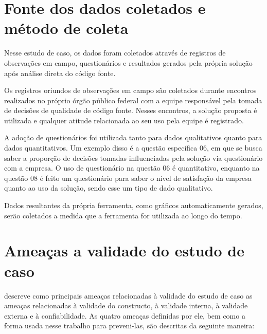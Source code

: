 \section{Fonte dos dados coletados e método de coleta}

Nesse estudo de caso, os dados foram coletados através de registros de observações em campo, questionários e resultados gerados pela própria solução após análise direta do código fonte.

Os registros oriundos de observações em campo são coletados durante encontros realizados no próprio órgão público federal com a equipe responsável pela tomada de decisões de qualidade de código fonte. Nesses encontros, a solução proposta é utilizada e qualquer atitude relacionada ao seu uso pela equipe é registrado.

A adoção de questionários foi utilizada tanto para dados qualitativos quanto para dados quantitativos. Um exemplo disso é a questão específica 06, em que se busca saber a proporção de decisões tomadas influenciadas pela solução via questionário com a empresa. O uso de questionário na questão 06 é quantitativo, enquanto na questão 08 é feito um questionário para saber o nível de satisfação da empresa quanto ao uso da solução, sendo esse um tipo de dado qualitativo.

Dados resultantes da própria ferramenta, como gráficos automaticamente gerados, serão coletados a medida que a ferramenta for utilizada ao longo do tempo.

\section{Ameaças a validade do estudo de caso}

 descreve como principais ameaças relacionadas à validade do estudo de caso as ameaças relacionadas à validade do constructo, à validade interna, à validade externa e à confiabilidade. As quatro ameaças definidas por ele, bem como a forma usada nesse trabalho para preveni-las, são descritas da seguinte maneira: 

